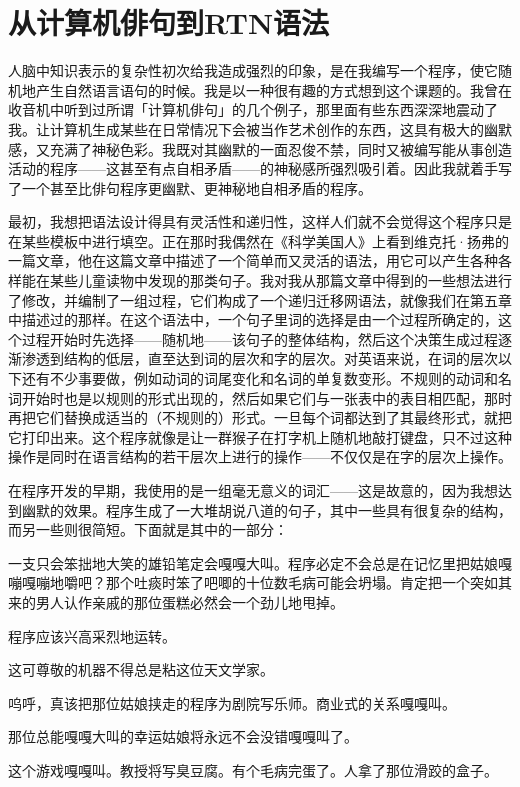\documentclass[
  12pt,
  twoside,
  openright,
  oldfontcommands,
]{memoir}
\begin{document}
\section{从计算机俳句到RTN语法}

人脑中知识表示的复杂性初次给我造成强烈的印象，是在我编写一个程序，使它随机地产生自然语言语句的时候。我是以一种很有趣的方式想到这个课题的。我曾在收音机中听到过所谓「计算机俳句」的几个例子，那里面有些东西深深地震动了我。让计算机生成某些在日常情况下会被当作艺术创作的东西，这具有极大的幽默感，又充满了神秘色彩。我既对其幽默的一面忍俊不禁，同时又被编写能从事创造活动的程序------这甚至有点自相矛盾------的神秘感所强烈吸引着。因此我就着手写了一个甚至比俳句程序更幽默、更神秘地自相矛盾的程序。

最初，我想把语法设计得具有灵活性和递归性，这样人们就不会觉得这个程序只是在某些模板中进行填空。正在那时我偶然在《科学美国人》上看到维克托·扬弗的一篇文章，他在这篇文章中描述了一个简单而又灵活的语法，用它可以产生各种各样能在某些儿童读物中发现的那类句子。我对我从那篇文章中得到的一些想法进行了修改，并编制了一组过程，它们构成了一个递归迁移网语法，就像我们在第五章中描述过的那样。在这个语法中，一个句子里词的选择是由一个过程所确定的，这个过程开始时先选择------随机地------该句子的整体结构，然后这个决策生成过程逐渐渗透到结构的低层，直至达到词的层次和字的层次。对英语来说，在词的层次以下还有不少事要做，例如动词的词尾变化和名词的单复数变形。不规则的动词和名词开始时也是以规则的形式出现的，然后如果它们与一张表中的表目相匹配，那时再把它们替换成适当的（不规则的）形式。一旦每个词都达到了其最终形式，就把它打印出来。这个程序就像是让一群猴子在打字机上随机地敲打键盘，只不过这种操作是同时在语言结构的若干层次上进行的操作------不仅仅是在字的层次上操作。

在程序开发的早期，我使用的是一组毫无意义的词汇------这是故意的，因为我想达到幽默的效果。程序生成了一大堆胡说八道的句子，其中一些具有很复杂的结构，而另一些则很简短。下面就是其中的一部分：

一支只会笨拙地大笑的雄铅笔定会嘎嘎大叫。程序必定不会总是在记忆里把姑娘嘎嘣嘎嘣地嚼吧？那个吐痰时笨了吧唧的十位数毛病可能会坍塌。肯定把一个突如其来的男人认作亲戚的那位蛋糕必然会一个劲儿地甩掉。

程序应该兴高采烈地运转。

这可尊敬的机器不得总是粘这位天文学家。

呜呼，真该把那位姑娘挟走的程序为剧院写乐师。商业式的关系嘎嘎叫。

那位总能嘎嘎大叫的幸运姑娘将永远不会没错嘎嘎叫了。

这个游戏嘎嘎叫。教授将写臭豆腐。有个毛病完蛋了。人拿了那位滑跤的盒子。
\end{document}
